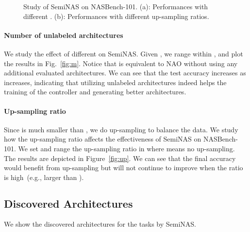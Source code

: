 \documentclass{article}
\begin{document}
\begin{figure}[htbp]
\centering
{}
\caption{Study of SemiNAS on NASBench-101. (a): Performances with different . (b): Performances with different up-sampling ratios.}
\label{fig:studyseminas}
\end{figure}

\paragraph{Number of unlabeled architectures } We study the effect of different  on SemiNAS. Given , we range  within , and plot the results in Fig.~\ref{fig:m}. Notice that  is equivalent to NAO without using any additional evaluated architectures. We can see that the test accuracy increases as  increases, indicating that utilizing unlabeled architectures indeed helps the training of the controller and generating better architectures.


\paragraph{Up-sampling ratio} Since  is much smaller than , we do up-sampling to balance the data. We study how the up-sampling ratio affects the effectiveness of SemiNAS on NASBench-101. We set  and range the up-sampling ratio in  where  means no up-sampling. The results are depicted in Figure~\ref{fig:up}. We can see that the final accuracy would benefit from up-sampling but will not continue to improve when the ratio is high~(e.g., larger than ).



\subsection{Discovered Architectures}
\label{sec:arch}
We show the discovered architectures for the tasks by SemiNAS.
\end{document}

